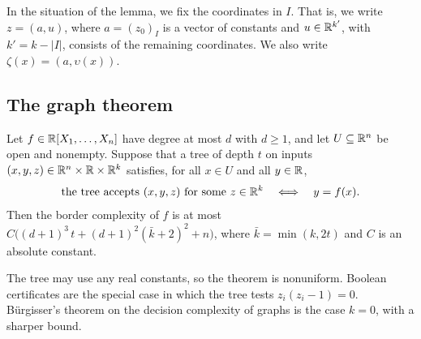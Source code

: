 In the situation of the lemma, we fix the coordinates in $I$. That is, we write $z=(a,u)$, where $a=(z_0)_I$ is a vector of constants and $u\in\mathbb{R}^{k'}$, with $k'=k-|I|$, consists of the remaining coordinates. We also write $\zeta(x)=(a,\upsilon(x))$.

\subsection{The graph theorem}

\begin{theorem}\label{thm:graph}
Let $f\in\mathbb{R}[X_1,\dots,X_n]$ have degree at most $d$ with $d\ge1$, and let $U\subseteq\mathbb{R}^n$ be open and nonempty. Suppose that a tree of depth $t$ on inputs $(x,y,z)\in\mathbb{R}^n\times\mathbb{R}\times\mathbb{R}^k$ satisfies, for all $x\in U$ and all $y\in\mathbb{R}$,
\[
\text{the tree accepts }(x,y,z)\text{ for some }z\in\mathbb{R}^k\quad\Longleftrightarrow\quad y=f(x).
\]
Then the border complexity of $f$ is at most $C\bigl((d+1)^3\,t+(d+1)^2(\bar k+2)^2+n\bigr)$, where $\bar k=\min(k,2t)$ and $C$ is an absolute constant.
\end{theorem}

The tree may use any real constants, so the theorem is nonuniform. Boolean certificates are the special case in which the tree tests $z_i(z_i-1)=0$. B\"urgisser's theorem on the decision complexity of graphs \cite[Corollary~1.5]{Bur04} is the case $k=0$, with a sharper bound.

